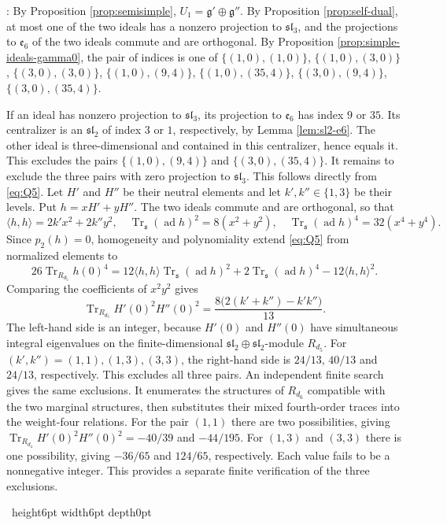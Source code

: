 \documentclass[leqno]{article}
\newcommand{\qed}{\hfill \vrule height6pt  width6pt depth0pt}
\newenvironment{proof}[1][]{\noindent {\it Proof #1} : }{\hbox{~}\qed
\smallskip
}
\numberwithin{equation}{section}
\begin{document}
\begin{proof}
By Proposition \ref{prop:semisimple}, $U_1 = \mathfrak g' \oplus \mathfrak g''$. By Proposition \ref{prop:self-dual}, at most one of the two ideals has a nonzero projection to $\mathfrak{sl}_3$, and the projections to $\mathfrak e_6$ of the two ideals commute and are orthogonal. By Proposition \ref{prop:simple-ideals-gamma0}, the pair of indices is one of $\{(1,0),(1,0)\}$, $\{(1,0),(3,0)\}$, $\{(3,0),(3,0)\}$, $\{(1,0),(9,4)\}$, $\{(1,0),(35,4)\}$, $\{(3,0),(9,4)\}$, $\{(3,0),(35,4)\}$.

If an ideal has nonzero projection to $\mathfrak{sl}_3$, its projection to $\mathfrak e_6$ has index $9$ or $35$. Its centralizer is an $\mathfrak{sl}_2$ of index $3$ or $1$, respectively, by Lemma \ref{lem:sl2-e6}. The other ideal is three-dimensional and contained in this centralizer, hence equals it. This excludes the pairs $\{(1,0),(9,4)\}$ and $\{(3,0),(35,4)\}$. It remains to exclude the three pairs with zero projection to $\mathfrak{sl}_3$. This follows directly from \eqref{eq:Q5}. Let $H'$ and $H''$ be their neutral elements and let $k',k'' \in \{1,3\}$ be their levels. Put $h = xH'+yH''$. The two ideals commute and are orthogonal, so that
\[
\langle h,h\rangle = 2k'x^2+2k''y^2,\quad
\operatorname{Tr}_{\mathfrak s}(\operatorname{ad}h)^2 = 8(x^2+y^2),\quad
\operatorname{Tr}_{\mathfrak s}(\operatorname{ad}h)^4 = 32(x^4+y^4).
\]
Since $p_2(h) = 0$, homogeneity and polynomiality extend \eqref{eq:Q5} from normalized elements to
\[
26\operatorname{Tr}_{R_{d_5}}h(0)^4
= 12\langle h,h\rangle\operatorname{Tr}_{\mathfrak s}(\operatorname{ad}h)^2
+2\operatorname{Tr}_{\mathfrak s}(\operatorname{ad}h)^4
-12\langle h,h\rangle^2.
\]
Comparing the coefficients of $x^2y^2$ gives
\begin{equation}
\label{eq:mixed-d5-exclusion}
\operatorname{Tr}_{R_{d_5}}H'(0)^2H''(0)^2
= \frac{8\big(2(k'+k'')-k'k''\big)}{13}.
\end{equation}
The left-hand side is an integer, because $H'(0)$ and $H''(0)$ have simultaneous integral eigenvalues on the finite-dimensional $\mathfrak{sl}_2 \oplus \mathfrak{sl}_2$-module $R_{d_5}$. For $(k',k'') = (1,1),(1,3),(3,3)$, the right-hand side is $24/13$, $40/13$ and $24/13$, respectively. This excludes all three pairs. An independent finite search gives the same exclusions. It enumerates the structures of $R_{d_6}$ compatible with the two marginal structures, then substitutes their mixed fourth-order traces into the weight-four relations. For the pair $(1,1)$ there are two possibilities, giving $\operatorname{Tr}_{R_{d_4}}H'(0)^2H''(0)^2 = -40/39$ and $-44/195$. For $(1,3)$ and $(3,3)$ there is one possibility, giving $-36/65$ and $124/65$, respectively. Each value fails to be a nonnegative integer. This provides a separate finite verification of the three exclusions.


\end{proof}
\end{document}
